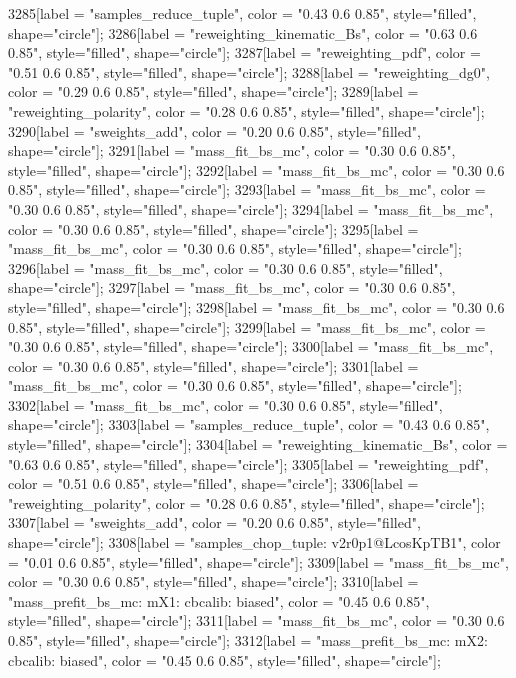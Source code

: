 {	3285[label = "samples_reduce_tuple", color = "0.43 0.6 0.85", style="filled", shape="circle"];
	3286[label = "reweighting_kinematic_Bs", color = "0.63 0.6 0.85", style="filled", shape="circle"];
	3287[label = "reweighting_pdf", color = "0.51 0.6 0.85", style="filled", shape="circle"];
	3288[label = "reweighting_dg0", color = "0.29 0.6 0.85", style="filled", shape="circle"];
	3289[label = "reweighting_polarity", color = "0.28 0.6 0.85", style="filled", shape="circle"];
	3290[label = "sweights_add", color = "0.20 0.6 0.85", style="filled", shape="circle"];
	3291[label = "mass_fit_bs_mc", color = "0.30 0.6 0.85", style="filled", shape="circle"];
	3292[label = "mass_fit_bs_mc", color = "0.30 0.6 0.85", style="filled", shape="circle"];
	3293[label = "mass_fit_bs_mc", color = "0.30 0.6 0.85", style="filled", shape="circle"];
	3294[label = "mass_fit_bs_mc", color = "0.30 0.6 0.85", style="filled", shape="circle"];
	3295[label = "mass_fit_bs_mc", color = "0.30 0.6 0.85", style="filled", shape="circle"];
	3296[label = "mass_fit_bs_mc", color = "0.30 0.6 0.85", style="filled", shape="circle"];
	3297[label = "mass_fit_bs_mc", color = "0.30 0.6 0.85", style="filled", shape="circle"];
	3298[label = "mass_fit_bs_mc", color = "0.30 0.6 0.85", style="filled", shape="circle"];
	3299[label = "mass_fit_bs_mc", color = "0.30 0.6 0.85", style="filled", shape="circle"];
	3300[label = "mass_fit_bs_mc", color = "0.30 0.6 0.85", style="filled", shape="circle"];
	3301[label = "mass_fit_bs_mc", color = "0.30 0.6 0.85", style="filled", shape="circle"];
	3302[label = "mass_fit_bs_mc", color = "0.30 0.6 0.85", style="filled", shape="circle"];
	3303[label = "samples_reduce_tuple", color = "0.43 0.6 0.85", style="filled", shape="circle"];
	3304[label = "reweighting_kinematic_Bs", color = "0.63 0.6 0.85", style="filled", shape="circle"];
	3305[label = "reweighting_pdf", color = "0.51 0.6 0.85", style="filled", shape="circle"];
	3306[label = "reweighting_polarity", color = "0.28 0.6 0.85", style="filled", shape="circle"];
	3307[label = "sweights_add", color = "0.20 0.6 0.85", style="filled", shape="circle"];
	3308[label = "samples_chop_tuple\nversion: v2r0p1@LcosKpTB1", color = "0.01 0.6 0.85", style="filled", shape="circle"];
	3309[label = "mass_fit_bs_mc", color = "0.30 0.6 0.85", style="filled", shape="circle"];
	3310[label = "mass_prefit_bs_mc\nmassbin: mX1\nmassmodel: cbcalib\ntrigger: biased", color = "0.45 0.6 0.85", style="filled", shape="circle"];
	3311[label = "mass_fit_bs_mc", color = "0.30 0.6 0.85", style="filled", shape="circle"];
	3312[label = "mass_prefit_bs_mc\nmassbin: mX2\nmassmodel: cbcalib\ntrigger: biased", color = "0.45 0.6 0.85", style="filled", shape="circle"];
}
